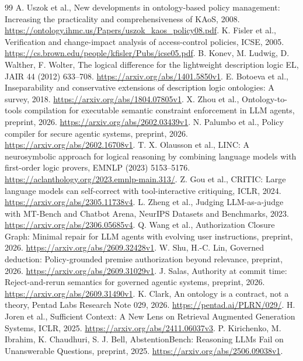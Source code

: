 \documentclass[a4paper,preprint,12pt,numbers,nopreprintline]{elsarticle}
\begin{document}
\begin{thebibliography}{99}
 A. Uszok et al., New developments in ontology-based policy management: Increasing the practicality and comprehensiveness of KAoS, 2008. \url{https://ontology.ihmc.us/Papers/uszok_kaos_policy08.pdf}.
 K. Fisler et al., Verification and change-impact analysis of access-control policies, ICSE, 2005. \url{https://cs.brown.edu/people/kfisler/Pubs/icse05.pdf}.
 B. Konev, M. Ludwig, D. Walther, F. Wolter, The logical difference for the lightweight description logic EL, JAIR 44 (2012) 633--708. \url{https://arxiv.org/abs/1401.5850v1}.
 E. Botoeva et al., Inseparability and conservative extensions of description logic ontologies: A survey, 2018. \url{https://arxiv.org/abs/1804.07805v1}.
 X. Zhou et al., Ontology-to-tools compilation for executable semantic constraint enforcement in LLM agents, preprint, 2026. \url{https://arxiv.org/abs/2602.03439v1}.
 N. Palumbo et al., Policy compiler for secure agentic systems, preprint, 2026. \url{https://arxiv.org/abs/2602.16708v1}.
 T. X. Olausson et al., LINC: A neurosymbolic approach for logical reasoning by combining language models with first-order logic provers, EMNLP (2023) 5153--5176. \url{https://aclanthology.org/2023.emnlp-main.313/}.
 Z. Gou et al., CRITIC: Large language models can self-correct with tool-interactive critiquing, ICLR, 2024. \url{https://arxiv.org/abs/2305.11738v4}.
 L. Zheng et al., Judging LLM-as-a-judge with MT-Bench and Chatbot Arena, NeurIPS Datasets and Benchmarks, 2023. \url{https://arxiv.org/abs/2306.05685v4}.
 Q. Wang et al., Authorization Closure Graph: Minimal repair for LLM agents with evolving user instructions, preprint, 2026. \url{https://arxiv.org/abs/2609.32428v1}.
 W. Shu, H.-C. Lin, Governed deduction: Policy-grounded premise authorization beyond relevance, preprint, 2026. \url{https://arxiv.org/abs/2609.31029v1}.
 J. Salas, Authority at commit time: Reject-and-rerun semantics for governed agentic systems, preprint, 2026. \url{https://arxiv.org/abs/2609.31490v1}.
 K. Clark, An ontology is a contract, not a theory, Pentad Labs Research Note 029, 2026. \url{https://pentad.ai/PLRN/029/}.
 H. Joren et al., Sufficient Context: A New Lens on Retrieval Augmented Generation Systems, ICLR, 2025. \url{https://arxiv.org/abs/2411.06037v3}.
 P. Kirichenko, M. Ibrahim, K. Chaudhuri, S. J. Bell, AbstentionBench: Reasoning LLMs Fail on Unanswerable Questions, preprint, 2025. \url{https://arxiv.org/abs/2506.09038v1}.

\end{thebibliography}
\end{document}
